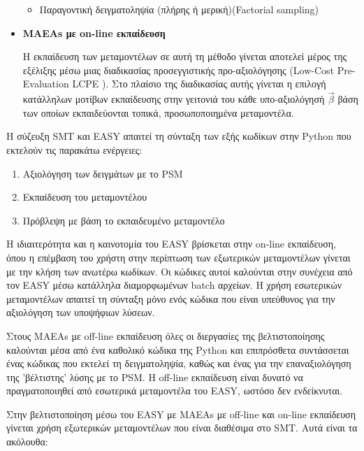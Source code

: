 \documentclass[twoside, 12pt,notitlepage]{report}
\begin{document}
\begin{itemize}
\begin{itemize}
\item Παραγοντική δειγματοληψία (πλήρης ή μερική)(Factorial 
sampling)\cite{Factorial_app}
\end{itemize}

\item \textbf{MAEAs με on-line εκπαίδευση} 

Η εκπαίδευση των μεταμοντέλων σε αυτή τη μέθοδο γίνεται αποτελεί 
μέρος της εξέλιξης μέσω μιας διαδικασίας προσεγγιστικής 
προ-αξιολόγησης (Low-Cost Pre-Evaluation LCPE \cite{LCPE_app}). Στο 
πλαίσιο της διαδικασίας αυτής γίνεται η επιλογή κατάλληλων μοτίβων 
εκπαίδευσης στην γειτονιά του κάθε υπο-αξιολόγησή $\vec{β}$ βάση των
οποίων εκπαιδεύονται τοπικά, προσωποποιημένα μεταμοντέλα.
\end{itemize}

Η σύζευξη SMT και EASY απαιτεί τη σύνταξη των εξής κωδίκων στην 
Python που εκτελούν τις παρακάτω ενέργειες:
\begin{enumerate}
\item Αξιολόγηση των δειγμάτων με το PSM

\item Εκπαίδευση του μεταμοντέλου

\item Πρόβλεψη με βάση το εκπαιδευμένο μεταμοντέλο
\end{enumerate}

\newpage


Η ιδιαιτερότητα και η καινοτομία του EASY βρίσκεται στην on-line 
εκπαίδευση, όπου η επέμβαση του χρήστη στην περίπτωση των εξωτερικών 
μεταμοντέλων γίνεται με την κλήση των ανωτέρω κωδίκων. Οι κώδικες 
αυτοί καλούνται στην συνέχεια από τον EASY μέσω κατάλληλα 
διαμορφωμένων batch αρχείων. Η χρήση εσωτερικών μεταμοντέλων απαιτεί 
τη σύνταξη μόνο ενός κώδικα που είναι υπεύθυνος για την αξιολόγηση 
των υποψήφιων λύσεων.

Στους MAEAs με off-line εκπαίδευση όλες οι διεργασίες της 
βελτιστοποίησης καλούνται μέσα από ένα καθολικό κώδικα της Python 
και επιπρόσθετα συντάσσεται ένας κώδικας που εκτελεί τη 
δειγματοληψία, καθώς και ένας για την επαναξιολόγηση της 'βέλτιστης' 
λύσης με το PSM. Η off-line εκπαίδευση είναι δυνατό να 
πραγματοποιηθεί από εσωτερικά μεταμοντέλα του EASY, ωστόσο δεν 
ενδείκνυται.

Στην βελτιστοποίηση μέσω του EASY με MAEAs με off-line και 
on-line εκπαίδευση γίνεται χρήση εξωτερικών μεταμοντέλων που 
είναι διαθέσιμα στο SMT. Αυτά είναι τα ακόλουθα:
\end{document}
